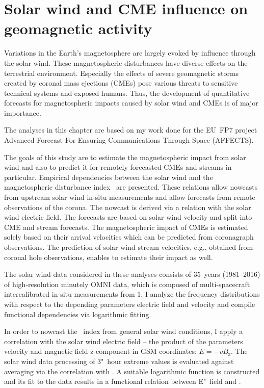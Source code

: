 
\chapter{Solar wind and CME influence on geomagnetic activity}
\label{chap:chapter2}

Variations in the Earth's magnetosphere are largely evoked by influence through the solar wind. These magnetospheric disturbances have diverse effects on the terrestrial environment. Especially the effects of severe geomagnetic storms created by coronal mass ejections (CMEs) pose various threats to sensitive technical systems and exposed humans. Thus, the development of quantitative forecasts for magnetospheric impacts caused by solar wind and CMEs is of major importance.

The analyses in this chapter are based on my work done for the EU~FP7 project Advanced Forecast For Ensuring Communications Through Space (AFFECTS).

The goals of this study are to estimate the magnetospheric impact from solar wind and also to predict it for remotely forecasted CMEs and streams in particular. Empirical dependencies between the solar wind and the magnetospheric disturbance index~\Kp{} are presented. These relations allow nowcasts from upstream solar wind in-situ measurements and allow forecasts from remote observations of the corona. The \Kp{} nowcast is derived via a relation with the solar wind electric field. The \Kp{} forecasts are based on solar wind velocity and split into CME and stream forecasts. The magnetospheric impact of CMEs is estimated solely based on their arrival velocities which can be predicted from coronagraph observations. The prediction of solar wind stream velocities, e.g., obtained from coronal hole observations, enables to estimate their impact as well.

The solar wind data considered in these analyses consists of 35~years (1981--2016) of high-resolution minutely OMNI data, which is composed of multi-spacecraft intercalibrated in-situ measurements from \SI{1}{\au}. I analyze the \Kp{} frequency distributions with respect to the depending parameters electric field and velocity and compile functional dependencies via logarithmic fitting.

In order to nowcast the \Kp~index from general solar wind conditions, I apply a correlation with the solar wind electric field -- the product of the parameters velocity and magnetic field z-component in GSM coordinates: $E = - v B_\text{z}$. The solar wind data processing of 3"~hour extreme values is evaluated against averaging via the correlation with \Kp{}. A suitable logarithmic function is constructed and its fit to the data results in a functional relation between E"~field and \Kp{}.


